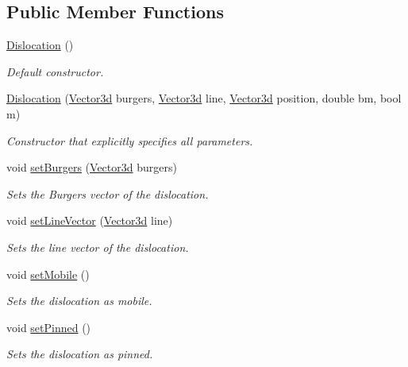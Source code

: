 \subsection*{Public Member Functions}
\begin{DoxyCompactItemize}
\item 
\hyperlink{classDislocation_ac5eed47d88651f3f2ed7f090036f804e}{Dislocation} ()
\begin{DoxyCompactList}\small\item\em Default constructor. \end{DoxyCompactList}\item 
\hyperlink{classDislocation_a332cb83378000624b6eea474ca31a8c2}{Dislocation} (\hyperlink{classVector3d}{Vector3d} burgers, \hyperlink{classVector3d}{Vector3d} line, \hyperlink{classVector3d}{Vector3d} position, double bm, bool m)
\begin{DoxyCompactList}\small\item\em Constructor that explicitly specifies all parameters. \end{DoxyCompactList}\item 
void \hyperlink{classDislocation_ab827fcf321729c1238caaa3bceff323a}{set\-Burgers} (\hyperlink{classVector3d}{Vector3d} burgers)
\begin{DoxyCompactList}\small\item\em Sets the Burgers vector of the dislocation. \end{DoxyCompactList}\item 
void \hyperlink{classDislocation_a6e814df21c8dfbd1e2e8f492673a79b2}{set\-Line\-Vector} (\hyperlink{classVector3d}{Vector3d} line)
\begin{DoxyCompactList}\small\item\em Sets the line vector of the dislocation. \end{DoxyCompactList}\item 
void \hyperlink{classDislocation_a59d404cb0d3dbaaa3380e4fd4018c4d3}{set\-Mobile} ()
\begin{DoxyCompactList}\small\item\em Sets the dislocation as mobile. \end{DoxyCompactList}\item 
void \hyperlink{classDislocation_a769db83b0546e7785b5890a5979a8d82}{set\-Pinned} ()
\begin{DoxyCompactList}\small\item\em Sets the dislocation as pinned. \end{DoxyCompactList}\item 

\end{DoxyCompactItemize}
